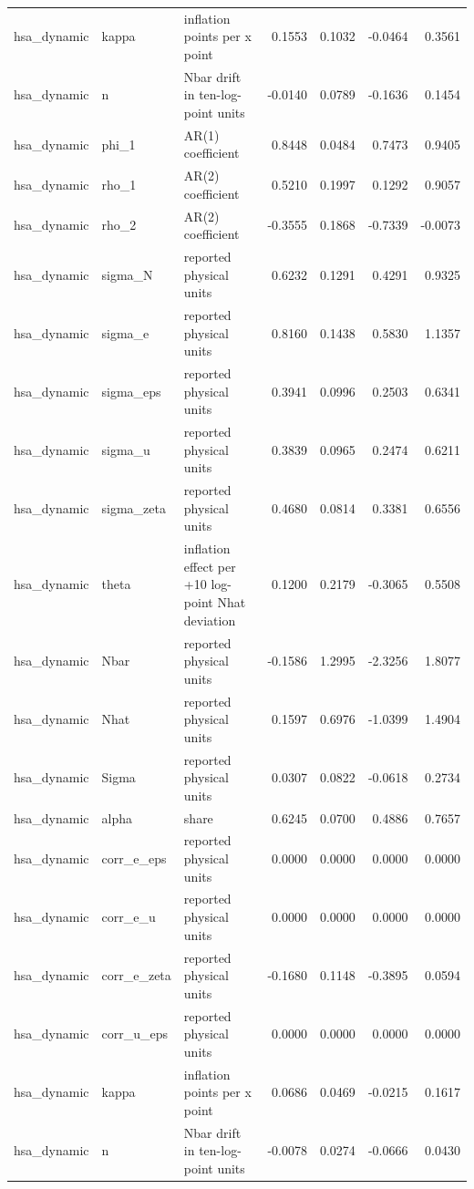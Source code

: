\begin{tabular}{lllrrrr}
hsa\_dynamic & kappa & inflation points per x point & 0.1553 & 0.1032 & -0.0464 & 0.3561 \\
hsa\_dynamic & n & Nbar drift in ten-log-point units & -0.0140 & 0.0789 & -0.1636 & 0.1454 \\
hsa\_dynamic & phi\_1 & AR(1) coefficient & 0.8448 & 0.0484 & 0.7473 & 0.9405 \\
hsa\_dynamic & rho\_1 & AR(2) coefficient & 0.5210 & 0.1997 & 0.1292 & 0.9057 \\
hsa\_dynamic & rho\_2 & AR(2) coefficient & -0.3555 & 0.1868 & -0.7339 & -0.0073 \\
hsa\_dynamic & sigma\_N & reported physical units & 0.6232 & 0.1291 & 0.4291 & 0.9325 \\
hsa\_dynamic & sigma\_e & reported physical units & 0.8160 & 0.1438 & 0.5830 & 1.1357 \\
hsa\_dynamic & sigma\_eps & reported physical units & 0.3941 & 0.0996 & 0.2503 & 0.6341 \\
hsa\_dynamic & sigma\_u & reported physical units & 0.3839 & 0.0965 & 0.2474 & 0.6211 \\
hsa\_dynamic & sigma\_zeta & reported physical units & 0.4680 & 0.0814 & 0.3381 & 0.6556 \\
hsa\_dynamic & theta & inflation effect per +10 log-point Nhat deviation & 0.1200 & 0.2179 & -0.3065 & 0.5508 \\
hsa\_dynamic & Nbar & reported physical units & -0.1586 & 1.2995 & -2.3256 & 1.8077 \\
hsa\_dynamic & Nhat & reported physical units & 0.1597 & 0.6976 & -1.0399 & 1.4904 \\
hsa\_dynamic & Sigma & reported physical units & 0.0307 & 0.0822 & -0.0618 & 0.2734 \\
hsa\_dynamic & alpha & share & 0.6245 & 0.0700 & 0.4886 & 0.7657 \\
hsa\_dynamic & corr\_e\_eps & reported physical units & 0.0000 & 0.0000 & 0.0000 & 0.0000 \\
hsa\_dynamic & corr\_e\_u & reported physical units & 0.0000 & 0.0000 & 0.0000 & 0.0000 \\
hsa\_dynamic & corr\_e\_zeta & reported physical units & -0.1680 & 0.1148 & -0.3895 & 0.0594 \\
hsa\_dynamic & corr\_u\_eps & reported physical units & 0.0000 & 0.0000 & 0.0000 & 0.0000 \\
hsa\_dynamic & kappa & inflation points per x point & 0.0686 & 0.0469 & -0.0215 & 0.1617 \\
hsa\_dynamic & n & Nbar drift in ten-log-point units & -0.0078 & 0.0274 & -0.0666 & 0.0430 \\

\end{tabular}
